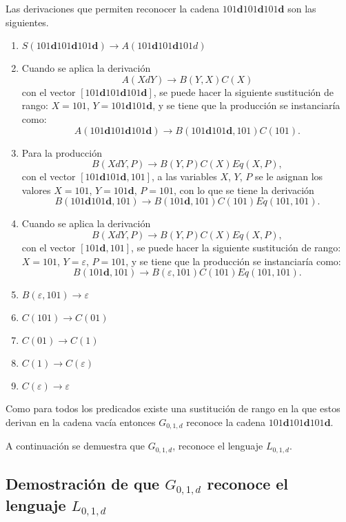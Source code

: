 Las derivaciones que permiten reconocer la cadena $101\mathbf{d}101\mathbf{d}101\mathbf{d}$ son las siguientes.


\begin{enumerate}
    \item $S(101\mathbf{d}101\mathbf{d}101\mathbf{d}) \to A(101\mathbf{d}101\mathbf{d}101d)$
    \item Cuando se aplica la derivación
          $$A(XdY)\to B(Y,X)C(X)$$
          con el vector  $[101\mathbf{d}101\mathbf{d}101\mathbf{d}]$, se puede hacer la siguiente sustitución de rango: $X=101$, $Y=101\mathbf{d}101\mathbf{d}$, y se tiene que la producción se instanciaría como:
          $$A(101\mathbf{d}101\mathbf{d}101\mathbf{d}) \to B(101\mathbf{d}101\mathbf{d},101)C(101).$$
    \item Para la producción $$B(XdY,P)\to B(Y,P) C(X) Eq(X,P),$$
          con el vector $[101\mathbf{d}101\mathbf{d},101]$, a las variables $X$, $Y$, $P$ se le asignan los valores $X=101$, $Y=101\mathbf{d}$, $P=101$, con lo que se tiene la derivación 
          $$B(101\mathbf{d}101\mathbf{d},101) \to B(101\mathbf{d},101)C(101)Eq(101,101).$$
    \item Cuando se aplica la derivación
          $$B(XdY,P)\to B(Y,P) C(X) Eq(X,P),$$
          con el vector $[101\mathbf{d},101]$, se puede hacer la siguiente sustitución de rango: $X=101$, $Y=\varepsilon$, $P=101$, y se tiene que la producción se instanciaría como:
          $$B(101\mathbf{d},101) \to B(\varepsilon,101)C(101)Eq(101,101).$$
    \item $B(\varepsilon,101) \to \varepsilon$
    \item $C(101)\to C(01)$
    \item $C(01)\to C(1)$
    \item $C(1)\to C(\varepsilon)$
    \item $C(\varepsilon)\to \varepsilon$
\end{enumerate}

Como para todos los predicados existe una sustitución de rango en la que estos derivan en la cadena vacía entonces  $G_{0,1,d}$ reconoce la cadena $101\mathbf{d}101\mathbf{d}101\mathbf{d}$.

A continuación se demuestra que $G_{0,1,d}$, reconoce el lenguaje $L_{0,1,d}$.

\subsection{Demostración de que $G_{0,1,d}$ reconoce el lenguaje $L_{0,1,d}$}
\label{sec:demg01d}

